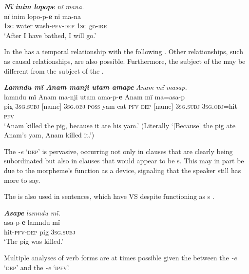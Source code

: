 \ea%
    \label{ex:overview:62}
    \textbf{\textit{Nï inim lopope}} \textit{nï mana.}\\
\gll    nï    inim  lopo-p-\textbf{e}    nï    ma-na\\
    1\textsc{sg}  water  wash-\textsc{pfv-dep}  \textsc{1sg}  go-\textsc{irr}\\
\glt    ‘After I have bathed, I will go.’
\z

In  the  has a  temporal relationship with the following . Other  relationships, such as  causal relationships, are also possible. Furthermore, the subject of the  may be different from the subject of the  .

\ea%
    \label{ex:overview:63}
    \textbf{\textit{Lamndu mï Anam manji utam amape}} \textit{Anam mï masap.}\\
\gll    lamndu  mï      Anam  ma-nji      utam  ama-p-\textbf{e} Anam    mï      ma=asa-p\\
    pig      3\textsc{sg.subj}  [name]  3\textsc{sg.obj-poss}  yam  eat-\textsc{pfv-dep}    [name]    3\textsc{sg.subj}  3\textsc{sg.obj}=hit-\textsc{pfv}\\
\glt    ‘Anam killed the pig, because it ate his yam.’ (Literally ‘[Because] the pig ate Anam’s yam, Anam killed it.’)
\z

The  \textit{{}-e} ‘\textsc{dep}’ is pervasive, occurring not only in clauses that are clearly being subordinated but also in clauses that would appear to be s. This may in part be due to the morpheme’s function as a  device, signaling that the speaker still has more to say.

The  is also used in  sentences, which have VS  despite functioning as s .

\ea%
    \label{ex:overview:64}
    \textbf{\textit{Asape}} \textit{lamndu mï.}\\
\gll    asa-p-\textbf{e}      lamndu  mï\\
    hit-\textsc{pfv-dep}  pig      3\textsc{sg.subj}\\
\glt    ‘The pig was killed.’
\z

Multiple analyses of verb forms are at times possible given the  between the  \textit{{}-e} ‘\textsc{dep}’ and the   \textit{{}-e} ‘\textsc{ipfv}’.


